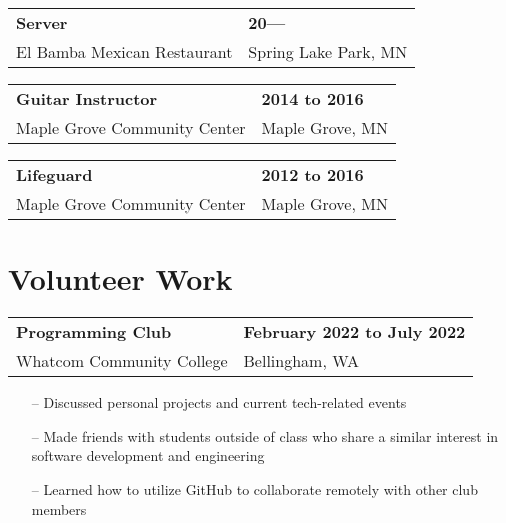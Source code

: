 \documentclass[11pt,letterpaper]{article}
\begin{document}
\begin{tabularx}{\textwidth}{lX}
    \textbf{Server} & \hfill \textbf{20—} \\[3.75pt]
    El Bamba Mexican Restaurant & \hfill Spring Lake Park, MN \\[3.75pt]
\end{tabularx}

\begin{tabularx}{\textwidth}{lX}
    \textbf{Guitar Instructor} & \hfill \textbf{2014 to 2016} \\[3.75pt]
    Maple Grove Community Center & \hfill Maple Grove, MN \\[3.75pt]
\end{tabularx}

\begin{tabularx}{\textwidth}{lX}
    \textbf{Lifeguard} & \hfill \textbf{2012 to 2016} \\[3.75pt]
    Maple Grove Community Center & \hfill Maple Grove, MN \\[3.75pt]
\end{tabularx}


\section{Volunteer Work}

\begin{tabularx}{\textwidth}{lX}
    \textbf{Programming Club} & \hfill \textbf{February 2022 to July 2022} \\[3.75pt]
    Whatcom Community College & \hfill Bellingham, WA \\[3.75pt]
\end{tabularx}
\begin{itemize}
    \item[--] Discussed personal projects and current tech-related events
    \item[--] Made friends with students outside of class who share a similar interest in software development and engineering
    \item[--] Learned how to utilize GitHub to collaborate remotely with other club members
\end{itemize}
\end{document}
